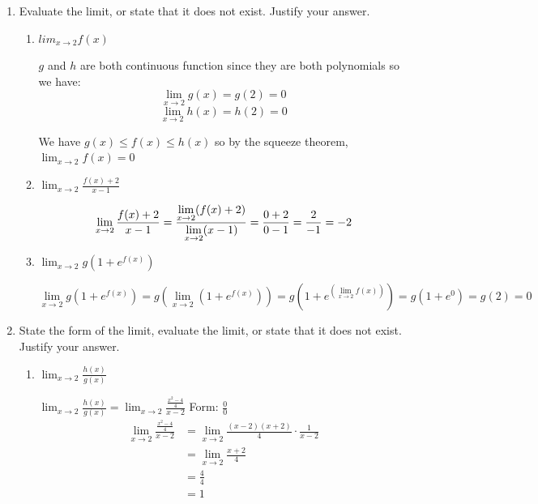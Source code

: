 \documentclass[nooutcomes,handout]{ximera}
\begin{document}
\begin{problem}
\begin{enumerate}
	\item	Evaluate the limit, or state that it does not exist.  Justify your answer.
		\begin{enumerate}
		\item $lim_{x \to 2} f(x)$
			\begin{freeResponse}
		$g$ and $h$ are both continuous function since they are both polynomials so we have:
		\[
		\lim_{x \to 2} g(x)=g(2)=0
		\]
		\[
		\lim_{x \to 2} h(x)=h(2)=0
		\]

		We have $g(x) \le f(x) \le h(x)$ so by the squeeze theorem, $\lim_{x \to 2} f(x)=0$
			\end{freeResponse}

		\item $\lim_{x \to 2} \frac{f(x)+2}{x-1}$
			\begin{freeResponse}
			\[
			\lim_{x \to 2}\frac{f(x)+2}{x-1}=\frac{\lim_{x \to 2}(f(x)+2)}{\lim_{x \to 2}(x-1)}\\
			= \frac{0+2}{0-1}\\
			= \frac{2}{-1}\\
			= -2
			\]
			\end{freeResponse}
		\item $\lim_{x \to 2} g(1+e^{f(x)})$
			\begin{freeResponse}
			\[
			\lim_{x \to 2} g(1+e^{f(x)})= g (\lim_{x \to 2} (1+e^{f(x)}))
			=g (1+e^{(\lim_{x \to 2}f(x))})
			=g(1+e^0)=g(2)=0
			\]
			\end{freeResponse}

		\end{enumerate}
	\item State the form of the limit, evaluate the limit, or state that it does not exist.  Justify your answer.
		\begin{enumerate}
		
		
		\item $\lim_{x \to 2}\frac{h(x)}{g(x)}$

		\begin{freeResponse}
			$\lim_{x \to 2}\frac{h(x)}{g(x)}=\lim_{x \to 2}\frac{\frac{x^2-4}{4}}{x-2}$
		Form: $\frac{{0}}{0}$ \\
		\begin{align*}
		\lim_{x \to 2}\frac{\frac{x^2-4}{4}}{x-2}&=\lim_{x \to 2}\frac{(x-2)(x+2)}{4}\cdot \frac{1}{x-2}\\
		&= \lim_{x \to 2} \frac{x+2}{4}\\
		&= \frac{4}{4}\\
		&= 1
		\end{align*}
		\end{freeResponse}	


\end{enumerate}
\end{enumerate}
\end{problem}
\end{document}
